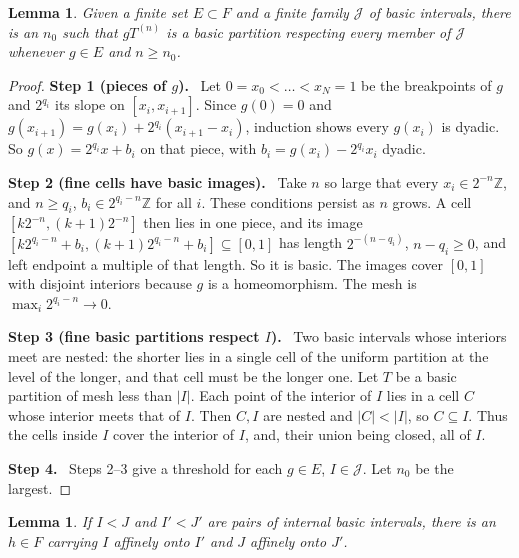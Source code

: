 \documentclass[11pt]{article}
\newcommand{\Z}{\mathbb Z}
\newcommand{\step}[1]{\par\smallskip\noindent\textbf{Step #1.}\ }
\newtheorem{lemma}[theorem]{Lemma}
\theoremstyle{definition}
\numberwithin{equation}{section}
\begin{document}
\begin{lemma}\label{dyad:eventual}
Given a finite set $E\subset F$ and a finite family $\mathcal J$ of basic
intervals, there is an $n_0$ such that $gT^{(n)}$ is a basic partition
respecting every member of $\mathcal J$ whenever $g\in E$ and $n\ge n_0$.
\end{lemma}

\begin{proof}
\step{1 (pieces of $g$)} Let $0=x_0<\dots<x_N=1$ be the breakpoints of $g$
and $2^{q_i}$ its slope on $[x_i,x_{i+1}]$. Since $g(0)=0$ and
$g(x_{i+1})=g(x_i)+2^{q_i}(x_{i+1}-x_i)$, induction shows every $g(x_i)$ is
dyadic. So $g(x)=2^{q_i}x+b_i$ on that piece, with
$b_i=g(x_i)-2^{q_i}x_i$ dyadic.

\step{2 (fine cells have basic images)} Take $n$ so large that every
$x_i\in2^{-n}\Z$, and $n\ge q_i$, $b_i\in2^{q_i-n}\Z$ for all $i$. These
conditions persist as $n$ grows. A cell $[k2^{-n},(k+1)2^{-n}]$ then lies in
one piece, and its image $[k2^{q_i-n}+b_i,(k+1)2^{q_i-n}+b_i]\subseteq[0,1]$
has length $2^{-(n-q_i)}$, $n-q_i\ge0$, and left endpoint a multiple of that
length. So it is basic. The images cover $[0,1]$ with disjoint interiors
because $g$ is a homeomorphism. The mesh is $\max_i2^{q_i-n}\to0$.

\step{3 (fine basic partitions respect $I$)} Two basic intervals whose
interiors meet are nested: the shorter lies in a single cell of the uniform
partition at the level of the longer, and that cell must be the longer one.
Let $T$ be a basic partition of mesh less than $|I|$. Each point of the
interior of $I$ lies in a cell $C$ whose interior meets that of $I$. Then
$C,I$ are nested and $|C|<|I|$, so $C\subseteq I$. Thus the cells inside
$I$ cover the interior of $I$, and, their union being closed, all of $I$.

\step{4} Steps 2--3 give a threshold for each $g\in E$, $I\in\mathcal J$.
Let $n_0$ be the largest.
\end{proof}

\begin{lemma}\label{dyad:transport}
If $I<J$ and $I'<J'$ are pairs of internal basic intervals, there is an
$h\in F$ carrying $I$ affinely onto $I'$ and $J$ affinely onto $J'$.
\end{lemma}
\end{document}
